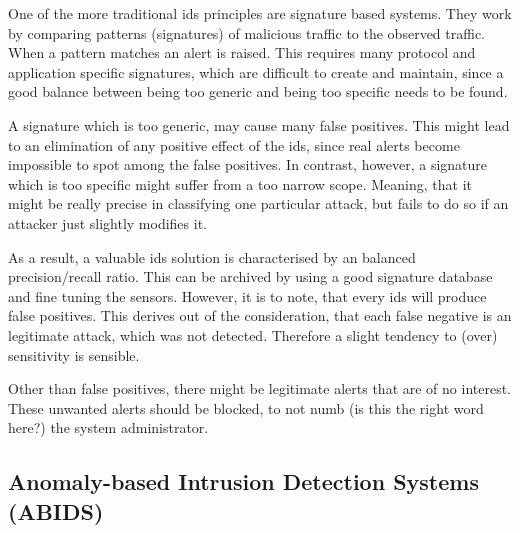 One of the more traditional \gls{ids} principles are signature based systems.
They work by comparing patterns (signatures) of malicious traffic to the observed traffic. When a pattern matches an alert is raised.
This requires many protocol and application specific signatures, which are difficult to create and maintain, since a good balance between being too generic and being too specific needs to be found.

A signature which is too generic, may cause many false positives. This might lead to an elimination of any positive effect of the \gls{ids}, since real alerts become impossible to spot among the false positives.
In contrast, however, a signature which is too specific might suffer from a too narrow scope. Meaning, that it might be really precise in classifying one particular attack, but fails to do so if an attacker just slightly modifies it.

As a result, a valuable \gls{ids} solution is characterised by an balanced precision/recall ratio. This can be archived by using a good signature database and fine tuning the sensors.
However, it is to note, that every \gls{ids} will produce false positives. This derives out of the consideration, that each false negative is an legitimate attack, which was not detected. Therefore a slight tendency to (over) sensitivity is sensible.

Other than false positives, there might be legitimate alerts that are of no interest. These unwanted alerts should be blocked, to not numb \alert{(is this the right word here?)} the system administrator. \parencite[cf.][pp.~205-206]{Northcutt2005}
	
\subsection{Anomaly-based Intrusion Detection Systems (ABIDS)}
\label{sec:background:network:ids:anomaly}
	
